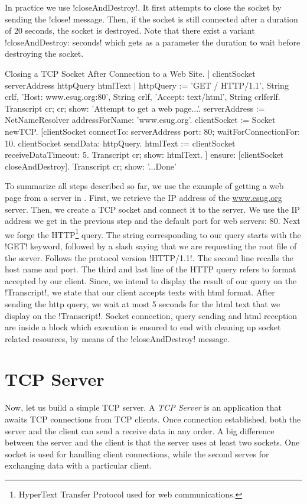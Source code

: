 \documentclass[a4paper,10pt,twoside]{book}
\begin{document}
In practice we use \ct!closeAndDestroy!. It first attempts to close the socket by sending the \ct!close! message.
Then, if the socket is still connected after a duration of 20 seconds, the socket is destroyed.
Note that there exist a variant \ct!closeAndDestroy: seconds! which gets as a parameter the duration to wait before destroying the socket.

\begin{script}{Closing a TCP Socket After Connection to a Web Site.}
| clientSocket serverAddress httpQuery htmlText |
httpQuery := 'GET / HTTP/1.1', String crlf, 
	'Host: www.esug.org:80', String crlf, 
	'Accept: text/html', String crlfcrlf.
Transcript cr; cr; show: 'Attempt to get a web page...'.
serverAddress := NetNameResolver addressForName: 'www.esug.org'.
clientSocket := Socket newTCP.
[clientSocket 
	connectTo: serverAddress port: 80;
	waitForConnectionFor: 10.
 clientSocket sendData: httpQuery.
 htmlText  := clientSocket receiveDataTimeout: 5.
 Transcript cr; show: htmlText.
] ensure: [clientSocket closeAndDestroy].
Transcript cr; show: '...Done'
\end{script}

To summarize all steps described so far, we use the example of getting a web page from a server in .
First, we retrieve the IP address of the \url{www.esug.org} server.
Then, we create a TCP socket and connect it to the server.
We use the IP address we get in the previous step and the default port for web servers: 80.
Next we forge the HTTP\footnote{HyperText Transfer Protocol used for web communications.} query.
The string corresponding  to our query starts with the \ct!GET! keyword, followed by a slash saying that we are requesting the root file of the server.
Follows the protocol version \ct!HTTP/1.1!.
The second line recalls the host name and port.
The third and last line of the HTTP query refers to format accepted by our client. 
Since, we intend to display the result of our query on the \ct!Transcript!, we state that our client accepts texts with html format.
After sending the http query, we wait at most 5 seconds for the html text that we display on the \ct!Transcript!.
Socket connection, query sending and html reception are inside a block which execution is ensured to end with cleaning up socket related resources, by means of the \ct!closeAndDestroy! message.

\section{TCP Server}
\label{sec:serverTcpSocket}
Now, let us build a simple TCP server. A \textit{TCP Server} is an application that awaits TCP connections from TCP clients. Once connection established, both the server and the client can send a receive data in any order. 
A big difference between the server and the client is that the server uses at least two sockets.
One socket is used for handling client connections, while the second serves for exchanging data with a particular client.
\end{document}

